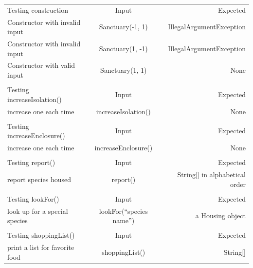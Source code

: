\documentclass[12pt]{amsart}
\begin{document}
\begin{table}[htbp]
   \begin{tabular}{@{} lcr @{}} %

      Testing construction      & Input & Expected \\
         Constructor with invalid input       & Sanctuary(-1, 1)     &  IllegalArgumentException \\
         Constructor with invalid input       & Sanctuary(1, -1)     &  IllegalArgumentException \\
         Constructor with valid input       & Sanctuary(1, 1)     &  None \\
          & & \\
       Testing increaseIsolation() & Input & Expected \\
       increase one each time & increaseIsolation() & None\\
          & & \\
       Testing increaseEnclosure() & Input & Expected \\
       increase one each time & increaseEnclosure() & None\\
          & & \\
       Testing report() & Input & Expected \\
       report species housed & report() & String[] in alphabetical order\\
          & & \\
       Testing lookFor() & Input & Expected \\
       look up for a special species & lookFor(``species name'') & a Housing object\\
          & & \\
       Testing shoppingList() & Input & Expected \\
       print a list for favorite food & shoppingList() & String[]\\
    \end{tabular}
\end{table}

\newpage
\end{document}

